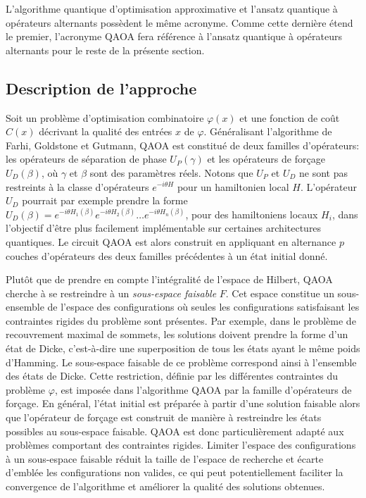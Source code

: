 L'algorithme quantique d'optimisation approximative et l'ansatz quantique à opérateurs alternants possèdent le même acronyme. Comme cette dernière étend le premier, l'acronyme QAOA fera référence à l'ansatz quantique à opérateurs alternants pour le reste de la présente section.


\subsection{Description de l'approche}

Soit un problème d'optimisation combinatoire $\varphi(x)$ et une fonction de coût $C(x)$ décrivant la qualité des entrées $x$ de $\varphi$. Généralisant l'algorithme de Farhi, Goldstone et Gutmann, QAOA est constitué de deux familles d'opérateurs: les opérateurs de séparation de phase $U_{P}(\gamma)$ et les opérateurs de forçage $U_{D}(\beta)$, où $\gamma$ et $\beta$ sont des paramètres réels. Notons que $U_{P}$ et $U_{D}$ ne sont pas restreints à la classe d'opérateurs $e^{-i \theta H}$ pour un hamiltonien local $H$. L'opérateur $U_{D}$ pourrait par exemple prendre la forme $U_{D}(\beta)=e^{-i \theta H_{1}(\beta)} e^{-i \theta H_{2}(\beta)} \dots e^{-i \theta H_{n}(\beta)}$, pour des hamiltoniens locaux $H_{i}$, dans l'objectif d'être plus facilement implémentable sur certaines architectures quantiques. Le circuit QAOA est alors construit en appliquant en alternance $p$ couches d'opérateurs des deux familles précédentes à un état initial donné.
        
Plutôt que de prendre en compte l'intégralité de l'espace de Hilbert, QAOA cherche à se restreindre à un \textit{sous-espace faisable} $F$. Cet espace constitue un sous-ensemble de l'espace des configurations où seules les configurations satisfaisant les contraintes rigides du problème sont présentes. Par exemple, dans le problème de recouvrement maximal de sommets, les solutions doivent prendre la forme d'un état de Dicke, c'est-à-dire une superposition de tous les états ayant le même poids d'Hamming. Le sous-espace faisable de ce problème correspond ainsi à l'ensemble des états de Dicke. Cette restriction, définie par les différentes contraintes du problème $\varphi$, est imposée dans l'algorithme QAOA par la famille d'opérateurs de forçage. En général, l'état initial est préparée à partir d'une solution faisable alors que l'opérateur de forçage est construit de manière à restreindre les états possibles au sous-espace faisable. QAOA est donc particulièrement adapté aux problèmes comportant des contraintes rigides. Limiter l'espace des configurations à un sous-espace faisable réduit la taille de l'espace de recherche et écarte d'emblée les configurations non valides, ce qui peut potentiellement faciliter la convergence de l'algorithme et améliorer la qualité des solutions obtenues.

